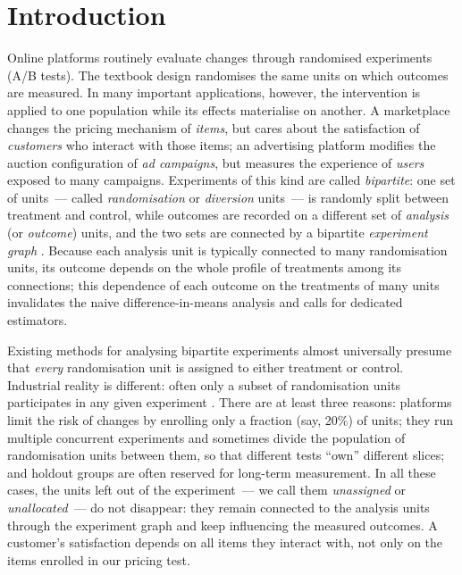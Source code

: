 \documentclass[sigconf,anonymous,review]{acmart}
\begin{document}

\maketitle

\section{Introduction}\label{sec:introduction}

Online platforms routinely evaluate changes through randomised experiments (A/B tests). The textbook design randomises the same units on which outcomes are measured. In many important applications, however, the intervention is applied to one population while its effects materialise on another. A marketplace changes the pricing mechanism of \emph{items}, but cares about the satisfaction of \emph{customers} who interact with those items; an advertising platform modifies the auction configuration of \emph{ad campaigns}, but measures the experience of \emph{users} exposed to many campaigns. Experiments of this kind are called \emph{bipartite}: one set of units~--- called \emph{randomisation} or \emph{diversion} units~--- is randomly split between treatment and control, while outcomes are recorded on a different set of \emph{analysis} (or \emph{outcome}) units, and the two sets are connected by a bipartite \emph{experiment graph} \cite{zigler2021bipartite,harshaw2023erl,doudchenko2020causal}. Because each analysis unit is typically connected to many randomisation units, its outcome depends on the whole profile of treatments among its connections; this dependence of each outcome on the treatments of many units invalidates the naive difference-in-means analysis and calls for dedicated estimators.

Existing methods for analysing bipartite experiments almost universally presume that \emph{every} randomisation unit is assigned to either treatment or control. Industrial reality is different: often only a subset of randomisation units participates in any given experiment \cite{kohavi2020trustworthy,tang2010overlapping}. There are at least three reasons: platforms limit the risk of changes by enrolling only a fraction (say, 20\%) of units; they run multiple concurrent experiments and sometimes divide the population of randomisation units between them, so that different tests ``own'' different slices; and holdout groups are often reserved for long-term measurement. In all these cases, the units left out of the experiment~--- we call them \emph{unassigned} or \emph{unallocated}~--- do not disappear: they remain connected to the analysis units through the experiment graph and keep influencing the measured outcomes. A customer's satisfaction depends on all items they interact with, not only on the items enrolled in our pricing test.
\end{document}
